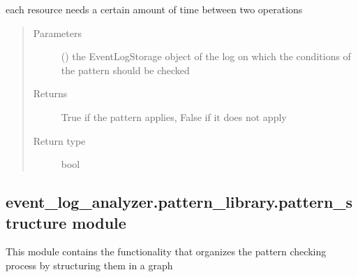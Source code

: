 \documentclass[letterpaper,10pt,english]{sphinxmanual}
\begin{document}
\begin{fulllineitems}

\begin{fulllineitems}
\label{\detokenize{event_log_analyzer:event_log_analyzer.pattern_library.manufacturing_scheduling_patterns.ResourceSetupTimes.pattern_applies}}
\sphinxAtStartPar
each resource needs a certain amount of time between two operations
\begin{quote}\begin{description}
\item[{Parameters}] \leavevmode
\sphinxAtStartPar
{} ({\hyperref[\detokenize{event_log_analyzer:event_log_analyzer.event_log.EventLogStorage}]{}}) \textendash{} the EventLogStorage object of the log on which the conditions of the pattern should be checked

\item[{Returns}] \leavevmode
\sphinxAtStartPar
True if the pattern applies, False if it does not apply

\item[{Return type}] \leavevmode
\sphinxAtStartPar
bool

\end{description}\end{quote}

\end{fulllineitems}


\end{fulllineitems}



\subsection{event\_log\_analyzer.pattern\_library.pattern\_structure module}
\label{\detokenize{event_log_analyzer:event-log-analyzer-pattern-library-pattern-structure-module}}\label{\detokenize{event_log_analyzer:module-event_log_analyzer.pattern_library.pattern_structure}}
\sphinxAtStartPar
This module contains the functionality that organizes the pattern checking process by structuring them in a graph
\end{document}
